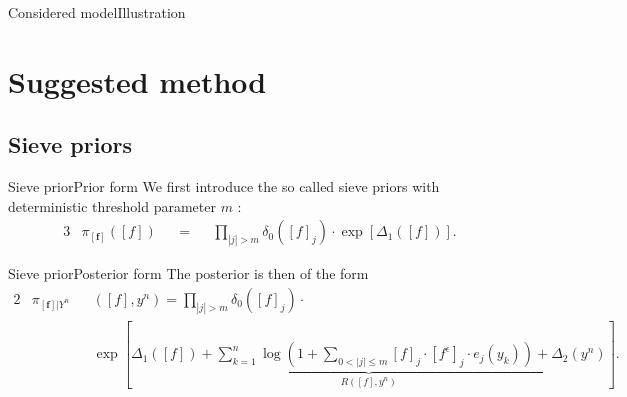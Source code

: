 \documentclass[10pt]{beamer}
\begin{document}
\begin{frame}{Considered model}{Illustration}
\begin{center}
\end{center}
\end{frame}

\section{Suggested method}
\subsection{Sieve priors}

\begin{frame}{Sieve prior}{Prior form}
We first introduce the so called sieve priors with deterministic threshold parameter $m$ :
\begin{alignat*}{3}
&\pi_{\left[\boldsymbol{f}\right]}\left(\left[f\right]\right) &&=&& \prod\limits_{\left\vert j \right\vert > m} \delta_{0}\left(\left[f\right]_{j}\right)\cdot\exp\left[\Delta_{1}\left(\left[f\right]\right)\right].
\end{alignat*}

\end{frame}

\begin{frame}{Sieve prior}{Posterior form}
The posterior is then of the form
\begin{alignat*}{2}
&\pi_{\left[\boldsymbol{f}\right] \vert Y^{n}}&&\left(\left[f\right], y^{n}\right) = \prod\limits_{\left\vert j \right\vert > m} \delta_{0}\left(\left[f\right]_{j}\right) \cdot\\
& && \exp\left[\underbrace{\Delta_{1}\left(\left[f\right]\right) + \sum\limits_{k = 1}^{n} \log\left(1 + \sum\limits_{0 < \vert j \vert \leq m} \left[f\right]_{j} \cdot \left[f^{\epsilon}\right]_{j} \cdot e_{j}(y_{k})\right) + \Delta_{2}(y^{n})}_{R\left(\left[f\right], y^{n}\right)}\right].
\end{alignat*}
\end{frame}
\end{document}
